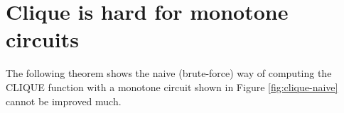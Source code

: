 % 
% 
% 
% 
% 
% 
% 
% 
% 
% 
% 
% 
% 
% 
% 
% 
% 

% 

\section{Clique is hard for monotone circuits }
The following theorem shows the naive (brute-force) way of computing the CLIQUE function with a monotone circuit shown in Figure \ref{fig:clique-naive}    cannot be improved much.

